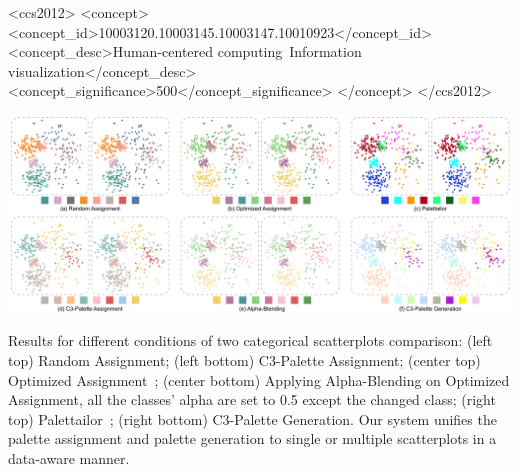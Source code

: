 \documentclass[manuscript,screen,review]{acmart}
\begin{document}
\begin{CCSXML}
<ccs2012>
<concept>
<concept_id>10003120.10003145.10003147.10010923</concept_id>
<concept_desc>Human-centered computing~Information visualization</concept_desc>
<concept_significance>500</concept_significance>
</concept>
</ccs2012>
\end{CCSXML}



\begin{teaserfigure}
  \includegraphics[width=\textwidth]{teaser}
  \caption{Results for different conditions of two categorical scatterplots comparison: (left top) Random Assignment; (left bottom) C3-Palette Assignment; (center top) Optimized Assignment~\cite{Wang2018};
(center bottom) Applying Alpha-Blending on Optimized Assignment, all the classes' alpha are set to 0.5 except the changed class; (right top) Palettailor~\cite{Lu21}; (right bottom) C3-Palette Generation. Our system unifies the palette assignment and palette generation to single or multiple scatterplots in a data-aware manner.}
  \label{fig:teaser}
\end{teaserfigure}

\maketitle
\end{document}
